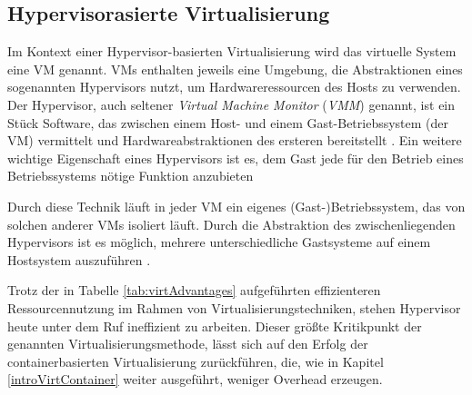 \documentclass[../main.tex]{subfiles}
\begin{document}



    \subsection{Hypervisorasierte Virtualisierung}
    \label{introVirtHypervisor}
      Im Kontext einer Hypervisor-basierten Virtualisierung wird das virtuelle System eine \acrshort{VM} genannt. \acrshort{VM}s enthalten jeweils eine Umgebung, die Abstraktionen eines sogenannten Hypervisors nutzt, um Hardwareressourcen des Hosts zu verwenden. Der Hypervisor, auch seltener \emph{Virtual Machine Monitor} (\emph{VMM}) genannt, ist ein Stück Software, das zwischen einem Host- und einem Gast-Betriebssystem (der \acrshort{VM}) vermittelt und Hardwareabstraktionen des ersteren bereitstellt \cite[S.6]{dockerBook}\cite[S.2]{containerVirtPerformance}\cite[S.2]{dockerSec1}. Ein weitere wichtige Eigenschaft eines Hypervisors ist es, dem Gast jede für den Betrieb eines Betriebssystems nötige Funktion anzubieten \cite[S.106]{tanenbaumOS}


      Durch diese Technik läuft in jeder \acrshort{VM} ein eigenes (Gast-)Betriebssystem, das von solchen anderer \acrshort{VM}s isoliert läuft. Durch die Abstraktion des zwischenliegenden Hypervisors ist es möglich, mehrere unterschiedliche Gastsysteme auf einem Hostsystem auszuführen \cite[S.2]{containerVirtPerformance}\cite[S.106]{tanenbaumOS}.

			Trotz der in Tabelle \ref{tab:virtAdvantages} aufgeführten effizienteren Ressourcennutzung im Rahmen von Virtualisierungstechniken, stehen Hypervisor heute unter dem Ruf ineffizient zu arbeiten. Dieser größte Kritikpunkt der genannten Virtualisierungsmethode, lässt sich auf den Erfolg der containerbasierten Virtualisierung zurückführen, die, wie in Kapitel \ref{introVirtContainer} weiter ausgeführt, weniger Overhead erzeugen.
\end{document}
